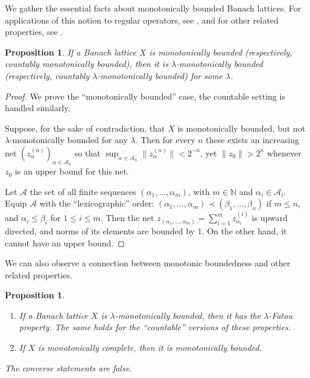 \documentclass{amsart}
\theoremstyle{plain}
\newtheorem{proposition}[theorem]{Proposition}
\theoremstyle{definition}
\numberwithin{equation}{section}
\newcommand{\N}{\mathbb{N}}
\begin{document}
We gather the essential facts about monotonically bounded Banach lattices. For applications of this notion to regular operators, see \cite[Section 4]{DLOT}, and for other related properties, see \cite{Taylor}.

\begin{proposition}
 If a Banach lattice $X$ is monotonically bounded (respectively, countably monotonically bounded), then it is $\lambda$-monotonically bounded (respectively, countably $\lambda$-monotonically bounded) for some $\lambda$.
\end{proposition}

\begin{proof}
 We prove the ``monotonically bounded'' case, the countable setting is handled similarly.
 
 Suppose, for the sake of contradiction, that $X$ is monotonically bounded, but not $\lambda$-monotonically bounded for any $\lambda$. Then for every $n$ these exists an increasing net $(z^{(n)}_\alpha)_{\alpha \in {\mathcal{A}}_n}$ so that $\sup_{\alpha \in {\mathcal{A}}_n} \|z^{(n)}_\alpha\| < 2^{-n}$, yet $\|z_0\| > 2^n$ whenever $z_0$ is an upper bound for this net.
 
 Let $\mathcal{A}$ the set of all finite sequences $(\alpha_1, \ldots, \alpha_m)$, with $m \in \N$ and $\alpha_i \in {\mathcal{A}}_i$. Equip $\mathcal{A}$ with the ``lexicographic'' order: $(\alpha_1, \ldots, \alpha_m) \prec (\beta_1, \ldots, \beta_n)$ if $m \leq n$, and $\alpha_i \leq \beta_i$ for $1 \leq i \leq m$. Then the net $z_{(\alpha_1, \ldots, \alpha_m)} = \sum_{i=1}^m z^{(i)}_{\alpha_i}$ is upward directed, and norms of its elements are bounded by $1$. On the other hand, it cannot have an upper bound.
\end{proof}

We can also observe a connection between monotonic boundedness and other related properties.

\begin{proposition}\label{connections}
 \begin{enumerate}
  \item If a Banach lattice $X$ is $\lambda$-monotonically bounded, then it has the $\lambda$-Fatou property. The same holds for the ``countable'' versions of these properties.
  \item If $X$ is monotonically complete, then it is monotonically bounded.
 \end{enumerate}
The converse statements are false.
\end{proposition}
\end{document}

